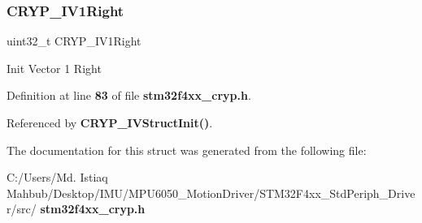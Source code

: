 \subsubsection{C\+R\+Y\+P\+\_\+\+I\+V1\+Right}
{\footnotesize\ttfamily uint32\+\_\+t C\+R\+Y\+P\+\_\+\+I\+V1\+Right}

Init Vector 1 Right 

Definition at line \textbf{ 83} of file \textbf{ stm32f4xx\+\_\+cryp.\+h}.



Referenced by \textbf{ C\+R\+Y\+P\+\_\+\+I\+V\+Struct\+Init()}.



The documentation for this struct was generated from the following file\+:\begin{DoxyCompactItemize}
\item 
C\+:/\+Users/\+Md. Istiaq Mahbub/\+Desktop/\+I\+M\+U/\+M\+P\+U6050\+\_\+\+Motion\+Driver/\+S\+T\+M32\+F4xx\+\_\+\+Std\+Periph\+\_\+\+Driver/src/\textbf{ stm32f4xx\+\_\+cryp.\+h}\end{DoxyCompactItemize}
